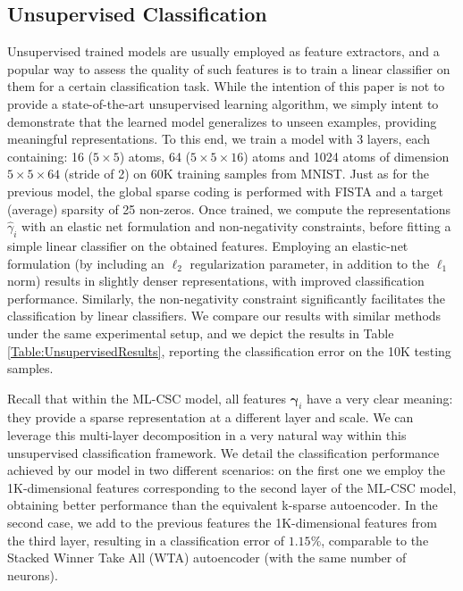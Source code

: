 \documentclass[10pt,journal]{IEEEtran}
\def\gama{{\boldsymbol \gamma}}
\theoremstyle{plain}
\theoremstyle{definition}
\begin{document}
\subsection{Unsupervised Classification}

Unsupervised trained models are usually employed as feature extractors, and a popular way to assess the quality of such features is to train a linear classifier on them for a certain classification task. While the intention of this paper is not to provide a state-of-the-art unsupervised learning algorithm, we simply intent to demonstrate that the learned model generalizes to unseen examples, providing meaningful representations. To this end, we train a model with 3 layers, each containing: 16 ($5\times5$) atoms, 64 ($5\times5\times16$) atoms and 1024 atoms of dimension $5\times5\times64$ (stride of 2) on 60K training samples from MNIST. Just as for the previous model, the global sparse coding is performed with FISTA and a target (average) sparsity of 25 non-zeros. Once trained, we compute the representations $\hat{\gamma}_i$ with an elastic net formulation and non-negativity constraints, before fitting a simple linear classifier on the obtained features. 
Employing an elastic-net formulation (by including an $\ell_2$ regularization parameter, in addition to the $\ell_1$ norm) results in slightly denser representations, with improved classification performance. Similarly, the non-negativity constraint significantly facilitates the classification by linear classifiers. We compare our results with similar methods under the same experimental setup, and we depict the results in Table \ref{Table:UnsupervisedResults}, reporting the classification error on the 10K testing samples. 

Recall that within the ML-CSC model, all features $\gama_i$ have a very clear meaning: they provide a sparse representation at a different layer and scale. We can leverage this multi-layer decomposition in a very natural way within this unsupervised classification framework. We detail the classification performance achieved by our model in two different scenarios: on the first one we employ the
1K-dimensional features corresponding to the second layer of the ML-CSC model, obtaining better performance than the equivalent k-sparse autoencoder. In the second case, we add to the previous features the 1K-dimensional features from the third layer, resulting in a classification error of $1.15\%$, comparable to the Stacked Winner Take All (WTA) autoencoder (with the same number of neurons). 
\end{document}

